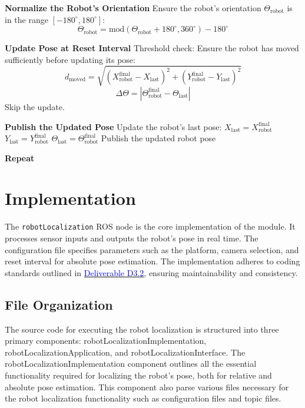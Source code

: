\documentclass{CSSRforAfrica}
\begin{document}
\clearpage

\begin{algorithm}
\begin{algorithmic}[1]

\State \textbf{Normalize the Robot’s Orientation}
\State Ensure the robot’s orientation $\Theta_{\text{robot}}$ is in the range $[-180^\circ, 180^\circ]$:
\[
\Theta_{\text{robot}} = \text{mod}(\Theta_{\text{robot}} + 180^\circ, 360^\circ) - 180^\circ
\]

\State \textbf{Update Pose at Reset Interval}
\State Threshold check: Ensure the robot has moved sufficiently before updating its pose:
\[
d_{\text{moved}} = \sqrt{(X_{\text{robot}}^{\text{final}} - X_{\text{last}})^2 + (Y_{\text{robot}}^{\text{final}} - Y_{\text{last}})^2}
\]
\[
\Delta\Theta = |\Theta_{\text{robot}}^{\text{final}} - \Theta_{\text{last}}|
\]
    \State Skip the update.
\EndIf

\State \textbf{Publish the Updated Pose}
    \State Update the robot’s last pose:
    \State $X_{\text{last}} = X_{\text{robot}}^{\text{final}}$
    \State $Y_{\text{last}} = Y_{\text{robot}}^{\text{final}}$
    \State $\Theta_{\text{last}} = \Theta_{\text{robot}}^{\text{final}}$
    \State Publish the updated robot pose
\EndIf

\State \textbf{Repeat}
\end{algorithmic}
\end{algorithm}


\newpage


\section{Implementation}
The \texttt{robotLocalization} ROS node is the core implementation of the module. It processes sensor inputs and outputs the robot’s pose in real time. The configuration file specifies parameters such as the platform, camera selection, and reset interval for absolute pose estimation. The implementation adheres to coding standards outlined in \href{https://cssr4africa.github.io/deliverables/CSSR4Africa_Deliverable_D3.2.pdf}{\textcolor{blue}{Deliverable D3.2}}, ensuring maintainability and consistency.

\subsection{File Organization}
The source code for executing the robot localization is structured into three primary components: robotLocalizationImplementation, robotLocalizationApplication, and robotLocalizationInterface. The robotLocalizationImplementation component outlines all the essential functionality required for localizing the robot's pose, both for relative and absolute pose estimation. This component also parse various files necessary for the robot localization functionality such as configuration files and topic files.
\end{document}

